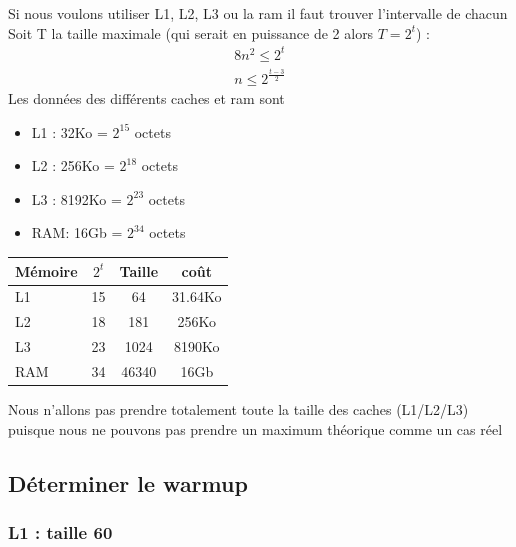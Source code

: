 \documentclass{report}
\begin{document}
    Si nous voulons utiliser L1, L2, L3 ou la ram il faut trouver l'intervalle de chacun
    Soit T la taille maximale (qui serait en puissance de 2 alors $T=2^t$) :
    \begin{align}
      8n^2 \leq 2^t \\
      n \leq 2^{\frac{t-3}{2}}
    \end{align}
    Les données des différents caches et ram sont
    \begin{itemize}
      \item L1 : 32Ko   = $2^{15}$ octets
      \item L2 : 256Ko  = $2^{18}$ octets
      \item L3 : 8192Ko = $2^{23}$ octets
      \item RAM: 16Gb   = $2^{34}$ octets
    \end{itemize}
    \vspace{5mm}
    \begin{tabular}{|l| c | c | c|}
      \hline
      Mémoire & $2^t$ & Taille & coût \\\hline
      \hline
      L1 & 15 & 64 & 31.64Ko \\\hline
      L2 & 18 & 181 & 256Ko \\\hline
      L3 & 23 & 1024 & 8190Ko \\\hline
      RAM & 34 & 46340 & 16Gb \\\hline
    \end{tabular}
    Nous n'allons pas prendre totalement toute la taille des caches (L1/L2/L3) puisque nous ne
    pouvons pas prendre un maximum théorique comme un cas réel
    \subsection{Déterminer le warmup}
    \subsubsection{L1 : taille 60}
      \newpage
\end{document}
